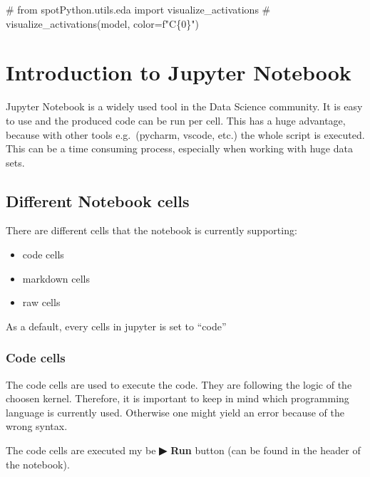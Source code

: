 \documentclass[
  letterpaper,
  DIV=11,
  numbers=noendperiod]{scrreprt}
\newenvironment{Shaded}{\begin{snugshade}}{\end{snugshade}}
\newcommand{\CommentTok}[1]{\textcolor[rgb]{0.37,0.37,0.37}{#1}}
\begin{document}
\begin{Shaded}
\begin{Highlighting}[]
\CommentTok{\# from spotPython.utils.eda import visualize\_activations}
\CommentTok{\# visualize\_activations(model, color=f"C\{0\}")}
\end{Highlighting}
\end{Shaded}

\cleardoublepage
{}
{}
\appendix

\chapter{Introduction to Jupyter
Notebook}\label{introduction-to-jupyter-notebook}

Jupyter Notebook is a widely used tool in the Data Science community. It
is easy to use and the produced code can be run per cell. This has a
huge advantage, because with other tools e.g.~(pycharm, vscode, etc.)
the whole script is executed. This can be a time consuming process,
especially when working with huge data sets.

\section{Different Notebook cells}\label{different-notebook-cells}

There are different cells that the notebook is currently supporting:

\begin{itemize}
\item
  code cells
\item
  markdown cells
\item
  raw cells
\end{itemize}

As a default, every cells in jupyter is set to ``code''

\subsection{Code cells}\label{code-cells}

The code cells are used to execute the code. They are following the
logic of the choosen kernel. Therefore, it is important to keep in mind
which programming language is currently used. Otherwise one might yield
an error because of the wrong syntax.

The code cells are executed my be \textbf{▶ Run} button (can be found in
the header of the notebook).
\end{document}
